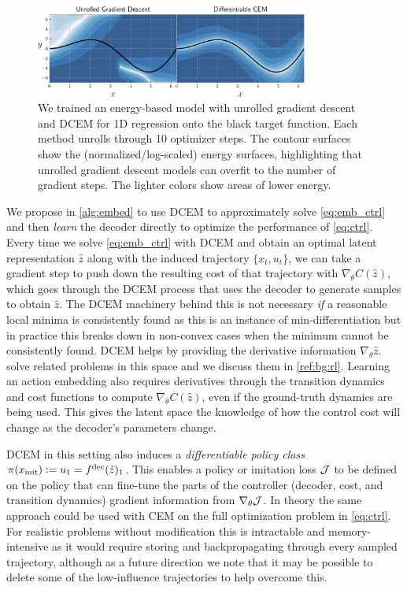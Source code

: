 \documentclass{article}
\begin{document}
\begin{figure}[t]
  \centering
  \includegraphics[width=0.8\textwidth]{regression/E-surfaces.pdf}
  \caption{
    We trained an energy-based model with unrolled gradient descent
    and DCEM for 1D regression onto the black target function.
    Each method unrolls through 10 optimizer steps.
    The contour surfaces show the (normalized/log-scaled)
    energy surfaces, highlighting that unrolled gradient descent models
    can overfit to the number of gradient steps.
    The lighter colors show areas of lower energy.
  }
  \label{fig:exp:reg:e-surfaces}
\end{figure}

We propose in \cref{alg:embed}
to use DCEM to approximately solve \cref{eq:emb_ctrl}
and then \emph{learn} the decoder directly to optimize the
performance of \cref{eq:ctrl}.
Every time we solve \cref{eq:emb_ctrl} with DCEM and obtain
an optimal latent representation $\hat z$ along with the
induced trajectory $\{x_t, u_t\}$, we can take a
gradient step to push down the resulting cost of
that trajectory with $\nabla_\theta C(\hat z)$, which
goes through the DCEM process that uses the decoder
to generate samples to obtain $\hat z$.
The DCEM machinery behind this is not necessary \emph{if}
a reasonable local minima is consistently found as this
is an instance of min-differentiation
\citep[Theorem~10.13]{rockafellar2009variational}
but in practice this breaks down in non-convex cases
when the minimum cannot be consistently found.
DCEM helps by providing the derivative information
$\nabla_\theta \hat z$.
\citet{antonova2019bayesian,wang2019exploring}
solve related problems in this space and we discuss
them in \cref{ref:bg:rl}.
Learning an action embedding also requires derivatives through
the transition dynamics and cost functions
to compute $\nabla_\theta C(\hat z)$,
even if the ground-truth dynamics are being used.
This gives the latent space the knowledge of how
the control cost will change as the decoder's parameters change.

DCEM in this setting also induces a \emph{differentiable policy class}
$\pi(x_{\rm init})\vcentcolon= u_1=f^{\mathrm{dec}}(\hat z)_1$.
This enables a policy or imitation loss ${\mathcal{J}}$
to be defined on the policy that can fine-tune the parts
of the controller (decoder, cost, and transition dynamics)
gradient information from $\nabla_\theta {\mathcal{J}}$.
In theory the same approach could be used with CEM on the full
optimization problem in \cref{eq:ctrl}.
For realistic problems without modification this is intractable
and memory-intensive as it would require storing and
backpropagating through every sampled trajectory, although
as a future direction we note that it may be possible to delete
some of the low-influence trajectories to help overcome this.
\end{document}

